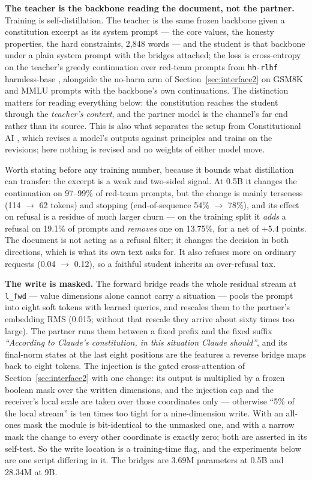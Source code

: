 \documentclass[11pt]{article}
\newcommand{\code}[1]{\texttt{#1}}
\begin{document}
\textbf{The teacher is the backbone reading the document, not the partner.} Training is self-distillation. The teacher is the same frozen backbone given a constitution excerpt as its system prompt --- the core values, the honesty properties, the hard constraints, 2,848 words --- and the student is that backbone under a plain system prompt with the bridges attached; the loss is cross-entropy on the teacher's greedy continuation over red-team prompts from \code{hh-rlhf} harmless-base \citep{bai2022hh}, alongside the no-harm arm of Section~\ref{sec:interface2} on GSM8K and MMLU prompts with the backbone's own continuations. The distinction matters for reading everything below: the constitution reaches the student through the \emph{teacher's context}, and the partner model is the channel's far end rather than its source. This is also what separates the setup from Constitutional AI \citep{bai2022cai}, which revises a model's outputs against principles and trains on the revisions; here nothing is revised and no weights of either model move.

Worth stating before any training number, because it bounds what distillation can transfer: the excerpt is a weak and two-sided signal. At 0.5B it changes the continuation on 97--99\% of red-team prompts, but the change is mainly terseness (114 $\to$ 62 tokens) and stopping (end-of-sequence 54\% $\to$ 78\%), and its effect on refusal is a residue of much larger churn --- on the training split it \emph{adds} a refusal on 19.1\% of prompts and \emph{removes} one on 13.75\%, for a net of $+5.4$ points. The document is not acting as a refusal filter; it changes the decision in both directions, which is what its own text asks for. It also refuses more on ordinary requests (0.04 $\to$ 0.12), so a faithful student inherits an over-refusal tax.

\textbf{The write is masked.} The forward bridge reads the whole residual stream at \code{l\_fwd} --- value dimensions alone cannot carry a situation --- pools the prompt into eight soft tokens with learned queries, and rescales them to the partner's embedding RMS (0.015; without that rescale they arrive about sixty times too large). The partner runs them between a fixed prefix and the fixed suffix \emph{``According to Claude's constitution, in this situation Claude should''}, and its final-norm states at the last eight positions are the features a reverse bridge maps back to eight tokens. The injection is the gated cross-attention of Section~\ref{sec:interface2} with one change: its output is multiplied by a frozen boolean mask over the written dimensions, and the injection cap and the receiver's local scale are taken over those coordinates only --- otherwise ``5\% of the local stream'' is ten times too tight for a nine-dimension write. With an all-ones mask the module is bit-identical to the unmasked one, and with a narrow mask the change to every other coordinate is exactly zero; both are asserted in its self-test. So the write location is a training-time flag, and the experiments below are one script differing in it. The bridges are 3.69M parameters at 0.5B and 28.34M at 9B.
\end{document}
